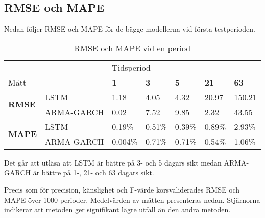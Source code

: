 \documentclass[12pt]{article}
\begin{document}
\subsection{RMSE och MAPE}
Nedan följer RMSE och MAPE för de bägge modellerna vid första testperioden.
\begin{table}[H]
\caption{RMSE och MAPE vid en period}
\begin{tabular}{||lllllll||}
\hline
                                     &            & \multicolumn{5}{l||}{Tidsperiod}                                  \\
Mått                                 &            & \textbf{1} & \textbf{3} & \textbf{5} & \textbf{21} & \textbf{63} \\ \hline\hline
\multirow{2}{*}{\textbf{RMSE}}  & LSTM       & 1.18          & 4.05         & 4.32          & 20.97           & 150.21        \\
                                & ARMA-GARCH & 0.02          & 7.52         & 9.85          & 2.32            & 43.55           \\ \cline{2-7} 
\multirow{2}{*}{\textbf{MAPE}}  & LSTM       & 0.19\%        & 0.51\%       & 0.39\%        & 0.89\%          & 2.93\%        \\
                                & ARMA-GARCH & 0.004\%        & 0.71\%       & 0.71\%        & 0.54\%          & 1.06\%        \\ \hline
\end{tabular}
\end{table}

Det går att utläsa att LSTM är bättre på 3- och 5 dagars sikt medan ARMA-GARCH är bättre på 1-, 21- och 63 dagars sikt.

Precis som för precision, känslighet och F-värde korsvaliderades RMSE och MAPE över 1000 perioder. Medelvärden av måtten presenteras nedan. Stjärnorna indikerar att metoden ger signifikant lägre utfall än den andra metoden.
\end{document}
